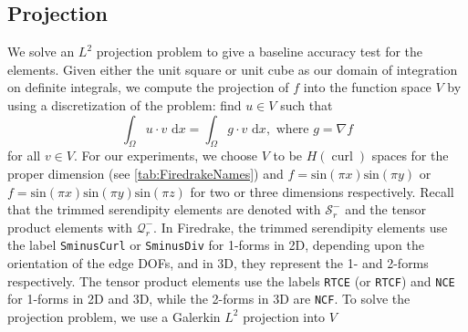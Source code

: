 \documentclass[format=acmsmall,screen,timestamp=false,a4paper]{acmart}
\DeclareMathOperator{\curl}{curl}
\newcommand\akg[1]{\textbf{\textcolor[rgb]{.5,0,1}{[Andrew: #1]}}}
\newcommand\josh[1]{\textbf{\textcolor[rgb]{0,.5,1}{[Josh: #1]}}}
\newcommand{\hcurl}{\ensuremath{{H}(\curl ) } }
\begin{document}








\subsection{Projection}
  
We solve an $L^2$ projection problem to give a baseline accuracy test for the elements. Given either the unit square or unit cube as our domain of integration on definite integrals, we compute the projection of $f$ into the function space $V$ by using a discretization of the problem: find $u\in V$ such that
\begin{equation*}
  \int_\Omega u \cdot v \text{ d}x = \int_\Omega g \cdot v \text{ d}x, \text{ where } g = \nabla f
\end{equation*}
for all $v \in V$.  For our experiments, we choose $V$ to be \hcurl spaces for the proper dimension (see \cref{tab:FiredrakeNames}) and $f = \text{sin}(\pi x)\text{sin}(\pi y)$ or $f=\text{sin}(\pi x)\text{sin}(\pi y)\text{sin}(\pi z)$ for two or three dimensions respectively.
Recall that the trimmed serendipity elements are denoted with $\mathcal{S}_r^-$ and the tensor product elements with $\mathcal{Q}^-_r$.  In Firedrake, the trimmed serendipity elements use the label \texttt{SminusCurl} or \texttt{SminusDiv} for 1-forms in 2D, depending upon the orientation of the edge DOFs, and in 3D, they represent the 1- and 2-forms respectively.  The tensor product elements use the labels \texttt{RTCE} (or \texttt{RTCF}) and  \texttt{NCE} for 1-forms in 2D and 3D, while the 2-forms in 3D are  \texttt{NCF}.  To solve the projection problem, we use a Galerkin $L^2$ projection into $V$
\end{document}
